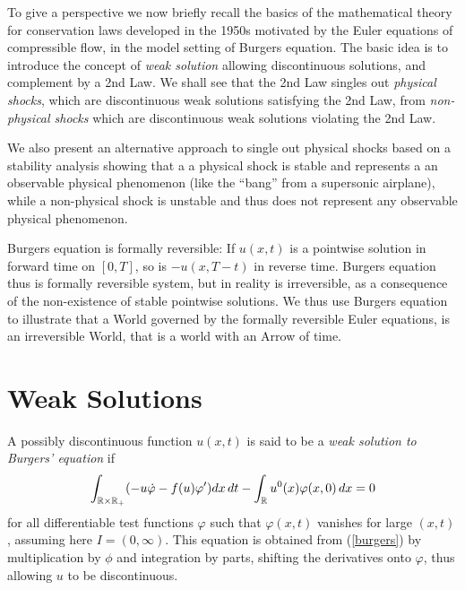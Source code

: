To give a perspective we now briefly recall the  
basics of the mathematical theory for conservation laws developed
in the 1950s motivated by the Euler equations of compressible
flow, in the model setting of Burgers equation. The basic idea is
to introduce the concept of \emph{weak solution} allowing discontinuous
solutions, and complement by a 2nd Law.  We shall see that the 2nd Law
singles out \emph{physical shocks}, which are discontinuous
weak solutions satisfying the 2nd Law, from \emph{non-physical shocks}
which are discontinuous weak solutions violating the 2nd Law.

We also present an alternative approach 
to single out physical shocks based on a stability analysis showing that a
a physical shock is stable and represents a
an observable physical phenomenon 
(like the ``bang'' from a supersonic airplane), 
while a non-physical shock is unstable and thus does not represent
any observable physical phenomenon.



Burgers equation is formally reversible: If $u(x,t)$ is a 
pointwise solution in forward time on $[0,T]$, 
so is $-u(x,T-t)$ in reverse time. Burgers equation 
thus is formally reversible system, but in reality is irreversible, 
as a consequence of the non-existence of stable pointwise solutions. 
We thus use Burgers equation to illustrate that a World governed 
by the formally reversible Euler equations, is an irreversible
World, that is a world with an Arrow of time.




\section{Weak Solutions} 

A possibly
discontinuous function $u(x,t)$ is said to be a \emph{weak
solution to Burgers' 
equation} if 
\begin{equation}\label{burgersweak}\int_{{\mathbb{R}}\times{\mathbb{R}}_+} (-u\dot\varphi -f(u)\varphi^\prime )dx\, dt-
\int_{\mathbb{R}} u^0(x)\varphi (x,0)\, dx =0
\end{equation}
for all differentiable test functions $\varphi$ such that
$\varphi (x,t)$ vanishes for large $(x,t)$, assuming here
$I=(0,\infty )$.
This equation is obtained from (\ref{burgers}) by multiplication by
$\phi$ and integration by parts, shifting the derivatives
onto $\varphi$, thus allowing $u$ to be discontinuous. 

